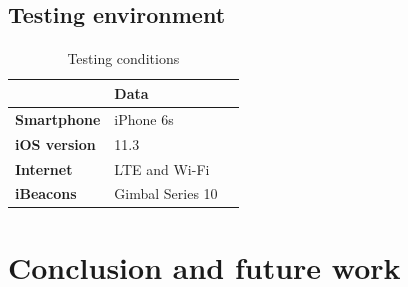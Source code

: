 \documentclass[12pt]{article}
\begin{document}
%
%
%
%
%


\subsection{Testing environment}
\paragraph{}



\begin{table}%
    \centering
    \caption{Testing conditions} 
    \label{my-label4}
       \begin{tabular}{|p{30mm}|p{55mm}|p{35mm}|}
 \hline
  & \textbf{Data}  \\ [0.5ex] 
 \hline\hline
 \textbf{Smartphone} & iPhone 6s \\
 \hline
  \textbf {iOS version} & 11.3 \\
 \hline
 \textbf{Internet} & LTE  and Wi-Fi \\
 \hline
 \textbf{iBeacons} & Gimbal  Series 10  \\
 \hline
 
    \end{tabular}
\end{table}

\section{ Conclusion and future work}
\label{sect-conclusion}
\end{document}
